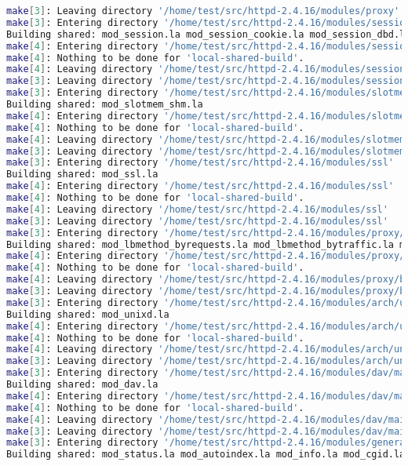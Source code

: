 \begin{lstlisting}[language=bash]
make[3]: Leaving directory '/home/test/src/httpd-2.4.16/modules/proxy'
make[3]: Entering directory '/home/test/src/httpd-2.4.16/modules/session'
Building shared: mod_session.la mod_session_cookie.la mod_session_dbd.la
make[4]: Entering directory '/home/test/src/httpd-2.4.16/modules/session'
make[4]: Nothing to be done for 'local-shared-build'.
make[4]: Leaving directory '/home/test/src/httpd-2.4.16/modules/session'
make[3]: Leaving directory '/home/test/src/httpd-2.4.16/modules/session'
make[3]: Entering directory '/home/test/src/httpd-2.4.16/modules/slotmem'
Building shared: mod_slotmem_shm.la
make[4]: Entering directory '/home/test/src/httpd-2.4.16/modules/slotmem'
make[4]: Nothing to be done for 'local-shared-build'.
make[4]: Leaving directory '/home/test/src/httpd-2.4.16/modules/slotmem'
make[3]: Leaving directory '/home/test/src/httpd-2.4.16/modules/slotmem'
make[3]: Entering directory '/home/test/src/httpd-2.4.16/modules/ssl'
Building shared: mod_ssl.la
make[4]: Entering directory '/home/test/src/httpd-2.4.16/modules/ssl'
make[4]: Nothing to be done for 'local-shared-build'.
make[4]: Leaving directory '/home/test/src/httpd-2.4.16/modules/ssl'
make[3]: Leaving directory '/home/test/src/httpd-2.4.16/modules/ssl'
make[3]: Entering directory '/home/test/src/httpd-2.4.16/modules/proxy/balancers'
Building shared: mod_lbmethod_byrequests.la mod_lbmethod_bytraffic.la mod_lbmethod_bybusyness.la mod_lbmethod_heartbeat.la
make[4]: Entering directory '/home/test/src/httpd-2.4.16/modules/proxy/balancers'
make[4]: Nothing to be done for 'local-shared-build'.
make[4]: Leaving directory '/home/test/src/httpd-2.4.16/modules/proxy/balancers'
make[3]: Leaving directory '/home/test/src/httpd-2.4.16/modules/proxy/balancers'
make[3]: Entering directory '/home/test/src/httpd-2.4.16/modules/arch/unix'
Building shared: mod_unixd.la
make[4]: Entering directory '/home/test/src/httpd-2.4.16/modules/arch/unix'
make[4]: Nothing to be done for 'local-shared-build'.
make[4]: Leaving directory '/home/test/src/httpd-2.4.16/modules/arch/unix'
make[3]: Leaving directory '/home/test/src/httpd-2.4.16/modules/arch/unix'
make[3]: Entering directory '/home/test/src/httpd-2.4.16/modules/dav/main'
Building shared: mod_dav.la
make[4]: Entering directory '/home/test/src/httpd-2.4.16/modules/dav/main'
make[4]: Nothing to be done for 'local-shared-build'.
make[4]: Leaving directory '/home/test/src/httpd-2.4.16/modules/dav/main'
make[3]: Leaving directory '/home/test/src/httpd-2.4.16/modules/dav/main'
make[3]: Entering directory '/home/test/src/httpd-2.4.16/modules/generators'
Building shared: mod_status.la mod_autoindex.la mod_info.la mod_cgid.la

\end{lstlisting}
